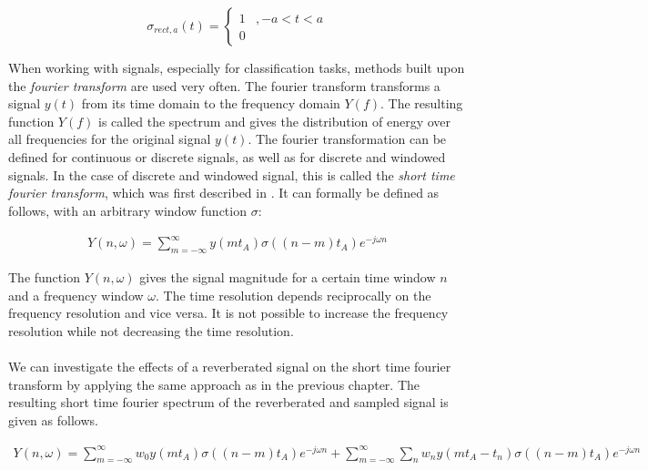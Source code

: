 \[
\sigma_{rect,a}(t) = \begin{cases}
1 &,-a < t < a \\
0
\end{cases}
\]

When working with signals, especially for classification tasks, methods built upon the \textit{fourier transform} are used very often. The fourier transform transforms a signal $y(t)$ from its time domain to the frequency domain $Y(f)$. The resulting function $Y(f)$ is called the spectrum and gives the distribution of energy over all frequencies for the original signal $y(t)$. The fourier transformation can be defined for continuous or discrete signals, as well as for discrete and windowed signals. In the case of discrete and windowed signal, this is called the \textit{short time fourier transform}, which was first described in \cite{gabor1946theory}. It can formally be defined as follows, with an arbitrary window function $\sigma$:

\begin{align}
Y(n, \omega) = \sum_{m = -\infty}^{\infty} y(mt_A) \sigma((n - m)t_A) e^{-j \omega n}  
\label{eq:stft}
\end{align}

The function $Y(n, \omega)$ gives the signal magnitude for a certain time window $n$ and a frequency window $\omega$. The time resolution depends reciprocally on the frequency resolution and vice versa. It is not possible to increase the frequency resolution while not decreasing the time resolution.\\ \\

We can investigate the effects of a reverberated signal on the short time fourier transform by applying the same approach as in the previous chapter. The resulting short time fourier spectrum of the reverberated and sampled signal is given as follows.

\begin{align}
Y(n, \omega) = \sum_{m = -\infty}^{\infty} w_0 y(mt_A) \sigma((n - m)t_A) e^{-j \omega n} + 
\sum_{m = -\infty}^{\infty} \sum_{n} w_n y(mt_A - t_n) \sigma((n - m)t_A) e^{-j \omega n}  
\label{eq:stftnoise}
\end{align}


